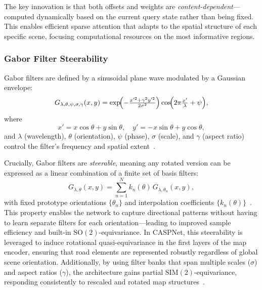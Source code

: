 The key innovation is that both offsets and weights are \emph{content-dependent}—computed dynamically based on the current query state rather than being fixed. This enables efficient sparse attention that adapts to the spatial structure of each specific scene, focusing computational resources on the most informative regions.

\subsubsection{Gabor Filter Steerability}
\label{ssec:gabor_filters}
Gabor filters are defined by a sinusoidal plane wave modulated by a Gaussian envelope:
\begin{equation}
\label{eq:gabor_filter}
G_{\lambda,\theta,\psi,\sigma,\gamma}(x,y)
= \exp\!\Bigl(-\tfrac{x'^{2} + \gamma^{2}y'^{2}}{2\sigma^{2}}\Bigr)
  \cos\!\Bigl(2\pi \tfrac{x'}{\lambda} + \psi\Bigr),
\end{equation}
where
\begin{equation}
\label{eq:gabor_rotation}
x' = x\cos\theta + y\sin\theta,\quad
y' = -x\sin\theta + y\cos\theta,
\end{equation}
and \(\lambda\) (wavelength), \(\theta\) (orientation), \(\psi\) (phase), \(\sigma\) (scale), and \(\gamma\) (aspect ratio) control the filter's frequency and spatial extent~\cite{Luan2018GCNN}.

Crucially, Gabor filters are \emph{steerable}, meaning any rotated version can be expressed as a linear combination of a finite set of basis filters:
\begin{equation}
\label{eq:gabor_steerability}
G_{\lambda,\theta}(x,y)
= \sum_{n=1}^N k_n(\theta)\,G_{\lambda,\theta_n}(x,y),
\end{equation}
with fixed prototype orientations \(\{\theta_n\}\) and interpolation coefficients \(\{k_n(\theta)\}\)~\cite{steerableGaborFilters}. This property enables the network to capture directional patterns without having to learn separate filters for each orientation—leading to improved sample efficiency and built-in \(\mathrm{SO}(2)\)-equivariance. In CASPNet, this steerability is leveraged to induce rotational quasi-equivariance in the first layers of the map encoder, ensuring that road elements are represented robustly regardless of global scene orientation. Additionally, by using filter banks that span multiple scales (\(\sigma\)) and aspect ratios (\(\gamma\)), the architecture gains partial \(\mathrm{SIM}(2)\)-equivariance, responding consistently to rescaled and rotated map structures~\cite{steerableGaborFilters}.

